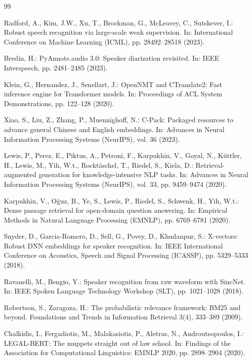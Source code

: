 \documentclass{llncs}
\begin{document}
\begin{thebibliography}{99}

Radford, A., Kim, J.W., Xu, T., Brockman, G., McLeavey, C., Sutskever, I.: Robust speech recognition via large-scale weak supervision. In: International Conference on Machine Learning (ICML), pp. 28492--28518 (2023).

Bredin, H.: PyAnnote.audio 3.0: Speaker diarization revisited. In: IEEE Interspeech, pp. 2481--2485 (2023).

Klein, G., Hernandez, J., Senellart, J.: OpenNMT and CTranslate2: Fast inference engine for Transformer models. In: Proceedings of ACL System Demonstrations, pp. 122--128 (2020).

Xiao, S., Liu, Z., Zhang, P., Muennighoff, N.: C-Pack: Packaged resources to advance general Chinese and English embeddings. In: Advances in Neural Information Processing Systems (NeurIPS), vol. 36 (2023).

Lewis, P., Perez, E., Piktus, A., Petroni, F., Karpukhin, V., Goyal, N., K\"uttler, H., Lewis, M., Yih, W.t., Rockt\"aschel, T., Riedel, S., Kiela, D.: Retrieval-augmented generation for knowledge-intensive NLP tasks. In: Advances in Neural Information Processing Systems (NeurIPS), vol. 33, pp. 9459--9474 (2020).

Karpukhin, V., O\u{g}uz, B., Ye, S., Lewis, P., Riedel, S., Schwenk, H., Yih, W.t.: Dense passage retrieval for open-domain question answering. In: Empirical Methods in Natural Language Processing (EMNLP), pp. 6769--6781 (2020).

Snyder, D., Garcia-Romero, D., Sell, G., Povey, D., Khudanpur, S.: X-vectors: Robust DNN embeddings for speaker recognition. In: IEEE International Conference on Acoustics, Speech and Signal Processing (ICASSP), pp. 5329--5333 (2018).

Ravanelli, M., Bengio, Y.: Speaker recognition from raw waveform with SincNet. In: IEEE Spoken Language Technology Workshop (SLT), pp. 1021--1028 (2018).

Robertson, S., Zaragoza, H.: The probabilistic relevance framework: BM25 and beyond. Foundations and Trends in Information Retrieval 3(4), 333--389 (2009).

Chalkidis, I., Fergadiotis, M., Malakasiotis, P., Aletras, N., Androutsopoulos, I.: LEGAL-BERT: The muppets straight out of law school. In: Findings of the Association for Computational Linguistics: EMNLP 2020, pp. 2898--2904 (2020).


\end{thebibliography}
\end{document}
